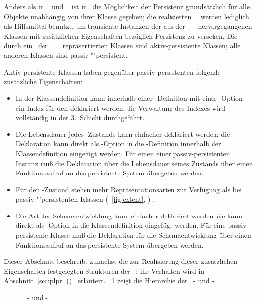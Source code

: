 \subsection{\protect\Spc\ \protect\mc[n]}
%
Anders als in \soh\ \cite[]{bib:ro87} und
\pclos\ \cite[]{bib:pa91a} ist in \plob\ die M\"{o}glichkeit
der Persistenz grunds\"{a}tzlich f\"{u}r alle Objekte un\-ab\-h\"{a}n\-gig von
ihrer Klasse gegeben; die realisierten \spc[n]\ \mc[n]\ werden
lediglich als Hilfsmittel benutzt, um transiente Instanzen der aus der
\spc[n]\ \clsmc\ \ hervorgegangenen
Klassen mit zu\-s\"{a}tz\-li\-chen Eigenschaften bez\"{u}glich Persistenz zu
versehen. Die durch ein
\clsmo\ der
\spc[n]\ \clsmc\ \ %
repr\"{a}sentierten Klassen sind aktiv-persistente Klassen; alle anderen
Klassen sind pas\-siv-""per\-si\-stent.
%
\par{}Aktiv-persistente Klassen haben gegen\"{u}ber passiv-persistenten
folgende zu\-s\"{a}tz\-li\-che Eigenschaften:
\begin{itemize}
%
\item In der Klassendefinition kann innerhalb einer \Slt\/-Definition
mit einer \Slt\/-Option ein Index f\"{u}r den \Slt\/ deklariert werden;
die Verwaltung des Indexes wird vollst\"{a}ndig in der 3.~Schicht
durchgef\"{u}hrt.
%
\item Die Lebensdauer jedes \Slt\/-Zustands kann einfacher deklariert
werden; die Deklaration kann direkt als \Slt\/-Option in die
\Slt\/-Definition innerhalb der Klassendefinition eingef\"{u}gt werden.
F\"{u}r einen \Slt\/ einer passiv-persistenten Instanz mu\ss{} die
Deklaration \"{u}ber die Lebensdauer seines Zustands \"{u}ber einen
Funktionsaufruf an das persistente System \"{u}ber\-ge\-ben werden.
%
\item F\"{u}r den \Slt\/-Zustand stehen mehr Repr\"{a}sentationsarten zur
Verf\"{u}gung als bei pas\-siv-""per\-si\-sten\-ten Klassen
\ifbericht%
\cite[]{bib:ki94a}%
\else%
(\figurename~\ref{fig:extent}, \citepage{\pageref{fig:extent}})%
\fi.
%
\item Die Art der Schemaentwicklung kann einfacher deklariert
werden; sie kann direkt als \cls[n]\/-Option in die Klassendefinition
eingef\"{u}gt werden.  F\"{u}r eine passiv-persistente Klasse mu\ss{} die
Deklaration f\"{u}r die Schemaentwicklung \"{u}ber einen Funktionsaufruf an
das persistente System \"{u}bergeben werden.
%
\end{itemize}
%
Dieser Abschnitt beschreibt zun\"{a}chst die zur Realisierung dieser
zu\-s\"{a}tz\-li\-chen Eigenschaften festgelegten Strukturen der
\spc[n]\ \mc[n]; ihr Verhalten wird in 
\ifbericht%
\cite[]{bib:ki94a}%
\else%
Abschnitt~\ref{sec:plpr} (\citepage{\pageref{sec:plpr}})
\fi\ erl\"{a}utert. \figurename~\ref{fig:pltlmcls} zeigt die Hierarchie
der \spc[n]\ \cls[n]- und \Slt\/-\mc[n].
%
\begin{figure}[htbp]%
\ifbuch%
\centerline{}%
\else%
\centerline{}%
\fi%
\caption{\protect\Spc\ \protect\cls[n]- und
\protect\Slt\/-\protect\mc[n]}\label{fig:pltlmcls}%
\end{figure}%
%
